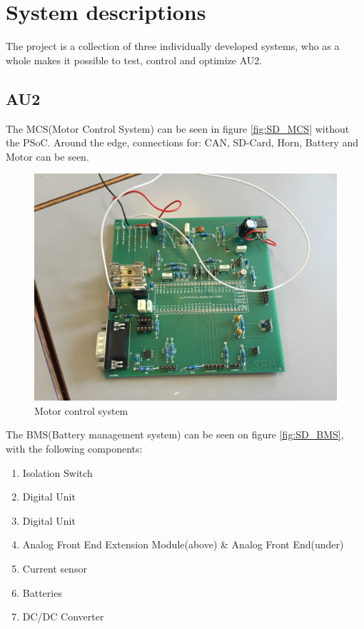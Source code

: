 \chapter{System descriptions}
The project is a collection of three individually developed systems, who as a whole makes it possible to test, control and optimize AU2.

\section{AU2}
The MCS(Motor Control System) can be seen in figure \vref{fig:SD_MCS} without the PSoC. Around the edge, connections for: CAN, SD-Card, Horn, Battery and Motor can be seen.

\begin{figure}[H]
	\centering
	\includegraphics[width=0.6\linewidth]{SubPages/Images/SD_MCS}
	\caption{Motor control system}
	\label{fig:SD_MCS}
\end{figure}

The BMS(Battery management system) can be seen on figure \vref{fig:SD_BMS}, with the following components:

\begin{enumerate}
	\item Isolation Switch
	\item Digital Unit
	\item Digital Unit 
	\item Analog Front End Extension Module(above) \& Analog Front End(under)
	\item Current sensor
	\item Batteries
	\item DC/DC Converter
\end{enumerate}

